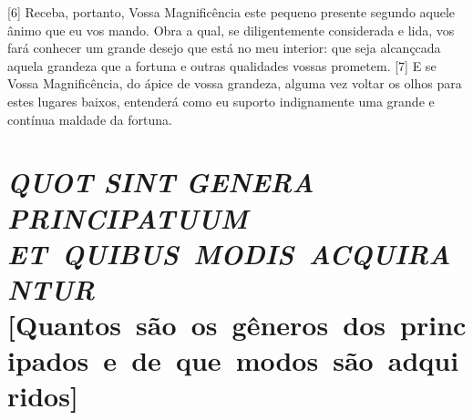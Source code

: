 {[}6{]} Receba, portanto, Vossa Magnificência este pequeno presente
segundo aquele ânimo que eu vos mando. Obra a qual, se diligentemente
considerada e lida, vos fará conhecer um grande desejo que está no meu
interior: que seja alcançcada aquela grandeza que a fortuna e outras
qualidades vossas prometem. {[}7{]} E se Vossa Magnificência, do ápice
de vossa grandeza, alguma vez voltar os olhos para estes lugares baixos,
entenderá como eu suporto indignamente uma grande e contínua maldade da
fortuna.

\setcounter{secnumdepth}{2}

\quebra\section{\emph{QUOT SINT GENERA PRINCIPATUUM ET~QUIBUS~MODIS~ACQUIRANTUR} {[}Quantos~são~os~gêneros~dos~principados~e~de~que~modos~são~adquiridos{]}}

